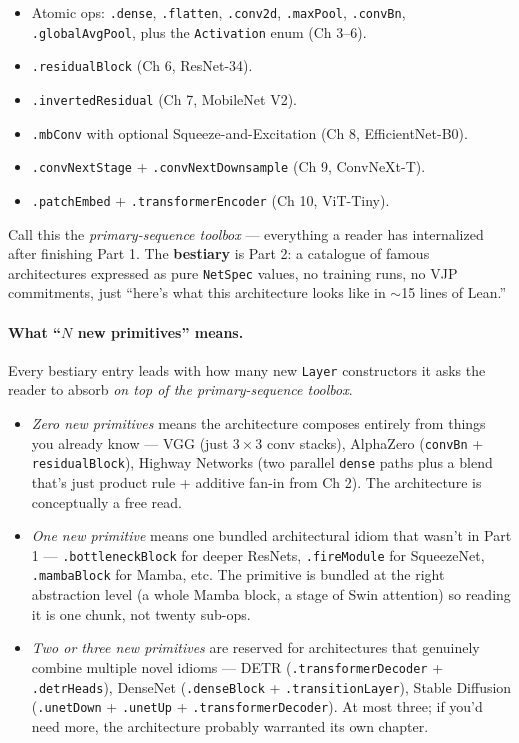 \begin{itemize}
  \item Atomic ops: \texttt{.dense}, \texttt{.flatten},
    \texttt{.conv2d}, \texttt{.maxPool}, \texttt{.convBn},
    \texttt{.globalAvgPool}, plus the \texttt{Activation} enum
    (Ch 3--6).
  \item \texttt{.residualBlock} (Ch 6, ResNet-34).
  \item \texttt{.invertedResidual} (Ch 7, MobileNet V2).
  \item \texttt{.mbConv} with optional Squeeze-and-Excitation
    (Ch 8, EfficientNet-B0).
  \item \texttt{.convNextStage} + \texttt{.convNextDownsample}
    (Ch 9, ConvNeXt-T).
  \item \texttt{.patchEmbed} + \texttt{.transformerEncoder}
    (Ch 10, ViT-Tiny).
\end{itemize}

Call this the \emph{primary-sequence toolbox} --- everything a
reader has internalized after finishing Part 1. The \textbf{bestiary}
is Part 2: a catalogue of famous architectures expressed as pure
\texttt{NetSpec} values, no training runs, no VJP commitments, just
``here's what this architecture looks like in $\sim$15 lines of Lean.''

\paragraph*{What ``\(N\) new primitives'' means.}
Every bestiary entry leads with how many new \texttt{Layer}
constructors it asks the reader to absorb \emph{on top of the
primary-sequence toolbox}.

\begin{itemize}
  \item \emph{Zero new primitives} means the architecture composes
    entirely from things you already know --- VGG (just $3\times 3$
    conv stacks), AlphaZero (\texttt{convBn} + \texttt{residualBlock}),
    Highway Networks (two parallel \texttt{dense} paths plus a blend
    that's just product rule + additive fan-in from Ch 2). The
    architecture is conceptually a free read.
  \item \emph{One new primitive} means one bundled architectural
    idiom that wasn't in Part 1 --- \texttt{.bottleneckBlock} for
    deeper ResNets, \texttt{.fireModule} for SqueezeNet,
    \texttt{.mambaBlock} for Mamba, etc. The primitive is bundled
    at the right abstraction level (a whole Mamba block, a stage of
    Swin attention) so reading it is one chunk, not twenty
    sub-ops.
  \item \emph{Two or three new primitives} are reserved for
    architectures that genuinely combine multiple novel idioms ---
    DETR (\texttt{.transformerDecoder} + \texttt{.detrHeads}),
    DenseNet (\texttt{.denseBlock} + \texttt{.transitionLayer}),
    Stable Diffusion (\texttt{.unetDown} + \texttt{.unetUp} +
    \texttt{.transformerDecoder}). At most three; if you'd need
    more, the architecture probably warranted its own chapter.
\end{itemize}

